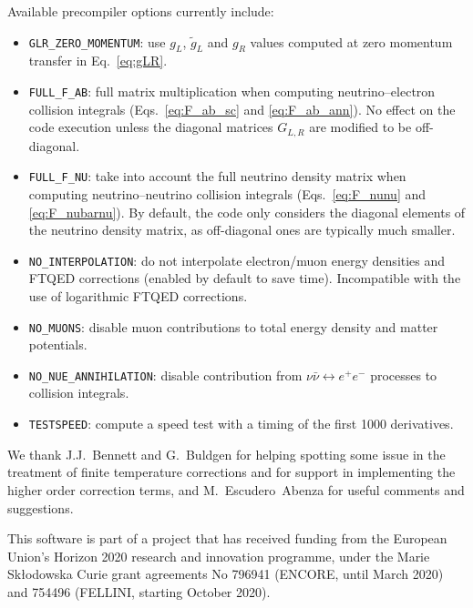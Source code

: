 \documentclass[notitlepage,nofootinbib,showpacs,preprintnumbers,amsmath,amssymb,superscriptaddress,prd,onecolumn]{revtex4-1}
\begin{document}
Available precompiler options currently include:
\begin{itemize}
\item \texttt{GLR\_ZERO\_MOMENTUM}: use $g_L$, $\tilde g_L$ and $g_R$ values
computed at zero momentum transfer \cite{Erler:2013xha} in Eq.~\eqref{eq:gLR}.
\item \texttt{FULL\_F\_AB}: full matrix multiplication
when computing neutrino--electron collision integrals
(Eqs.~\eqref{eq:F_ab_sc} and \eqref{eq:F_ab_ann}).
No effect on the code execution unless the diagonal matrices $G_{L,R}$ are modified to be off-diagonal.
\item \texttt{FULL\_F\_NU}: take into account the full neutrino density matrix
when computing neutrino--neutrino collision integrals
(Eqs.~\eqref{eq:F_nunu} and \eqref{eq:F_nubarnu}).
By default, the code only considers the diagonal elements of the neutrino density matrix,
as off-diagonal ones are typically much smaller.
\item \texttt{NO\_INTERPOLATION}: do not interpolate electron/muon energy densities and FTQED corrections
(enabled by default to save time). Incompatible with the use of logarithmic FTQED corrections.
\item \texttt{NO\_MUONS}: disable muon contributions to total energy density and matter potentials.
\item \texttt{NO\_NUE\_ANNIHILATION}: disable contribution from $\nu\bar\nu\leftrightarrow e^+e^-$ processes to collision integrals.
\item \texttt{TESTSPEED}: compute a speed test with a timing of the first 1000 derivatives.
\end{itemize}



\acknowledgments
We thank J.J.~Bennett and G.~Buldgen for helping spotting
some issue in the treatment of finite temperature corrections
and for support in implementing the higher order correction terms,
and M.~Escudero~Abenza for useful comments and suggestions.

This software is part of a project that has received funding from the European Union's Horizon 2020 research and innovation programme, under the Marie Sk{\l}odowska Curie grant agreements No
796941 (ENCORE, until March 2020) and
754496 (FELLINI, starting October 2020).




\end{document}
